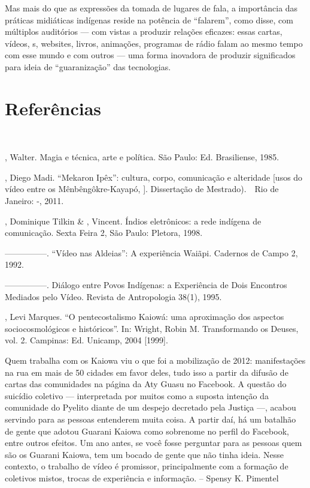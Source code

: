 Mas mais do que as expressões da tomada de lugares de fala, a
importância das práticas midiáticas indígenas reside na potência de
``falarem'', como disse, com múltiplos auditórios — com vistas a produzir
relações eficazes: essas cartas, vídeos, s, websites, livros,
animações, programas de rádio falam ao mesmo tempo com esse mundo e com
outros — uma forma inovadora de produzir significados para ideia de
``guaranização'' das tecnologias.

\section{Referências}\ \  \ \ 

\begin{Parskip}
, Walter. Magia e técnica, arte e política. São Paulo: Ed.
Brasiliense, 1985.

, Diego Madi. ``Mekaron Ipêx'': cultura, corpo, comunicação e
alteridade [usos do vídeo entre os Mênbêngôkre-Kayapó, ]. Dissertação
de Mestrado).\ \ Rio de Janeiro: -, 2011. 

, Dominique Tilkin \& , Vincent. Índios eletrônicos: a
rede indígena de comunicação.  Sexta Feira 2, São Paulo: Pletora, 1998.


—————. ``Vídeo nas Aldeias'': A experiência Waiãpi. Cadernos de Campo 2,
1992.

—————. Diálogo entre Povos Indígenas: a Experiência de Dois Encontros
Mediados pelo Vídeo. Revista de Antropologia 38(1), 1995.

, Levi Marques. ``O pentecostalismo Kaiowá: uma aproximação dos
aspectos sociocosmológicos e históricos''. In: Wright, Robin M.
Transformando os Deuses, vol. 2. Campinas: Ed. Unicamp, 2004 [1999].
\end{Parskip}

Quem trabalha com os Kaiowa viu o que foi a mobilização de 2012:
manifestações na rua em mais de 50 cidades em favor deles, tudo isso a
partir da difusão de cartas das comunidades na página da Aty Guasu no
Facebook. A questão do suicídio coletivo — interpretada por muitos como
a suposta intenção da comunidade do Pyelito diante de um despejo
decretado pela Justiça —, acabou servindo para as pessoas entenderem
muita coisa. A partir daí, há um batalhão de gente que adotou Guarani
Kaiowa como sobrenome no perfil do Facebook, entre outros efeitos. Um
ano antes, se você fosse perguntar para as pessoas quem são os Guarani
Kaiowa, tem um bocado de gente que não tinha ideia. Nesse contexto, o
trabalho de vídeo é promissor, principalmente com a formação de
coletivos mistos, trocas de experiência e informação. – Spensy K.
Pimentel 

